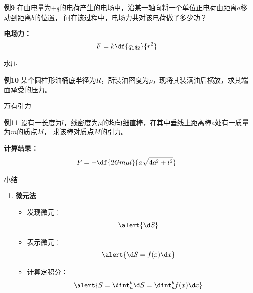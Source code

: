\begin{frame}
	\linespread{1.5}
	\begin{exampleblock}{{\bf 例9}\hfill}
		在由电量为$+q$的电荷产生的电场中，沿某一轴向将一个单位正电荷由距离$a$移动到距离$b$的位置，
		问在该过程中，电场力共对该电荷做了多少功？
	\end{exampleblock}
	\bigskip
	{\bf 电场力：}
	$$F=k\df{q_1q_2}{r^2}$$
\end{frame}

\begin{frame}{水压}
	\linespread{1.5}
	\begin{exampleblock}{{\bf 例10}\hfill}
		某个圆柱形油桶底半径为$R$，所装油密度为$\rho$，现将其装满油后横放，求其端面承受的压力。
	\end{exampleblock}
\end{frame}

\begin{frame}{万有引力}
	\linespread{1.2}
	\begin{exampleblock}{{\bf 例11}\hfill}
		设有一长度为$l$，线密度为$\mu$的均匀细直棒，在其中垂线上距离棒$a$处有一质量为$m$的质点$M$，
		求该棒对质点$M$的引力。
	\end{exampleblock}
	{\bf 计算结果：}
	$$F=-\df{2Gm\mu l}{a\sqrt{4a^2+l^2}}$$
\end{frame}

\begin{frame}[<+->]{小结}
	\linespread{1.2}
	\begin{enumerate}
	  \item {\bf 微元法}
	  \begin{itemize}
	    \item 发现微元：$$\alert{\d S}$$
	    \item 表示微元：$$\alert{\d S=f(x)\d x}$$
	    \item 计算定积分：$$\alert{S=\dint_a^b\d S=\dint_a^bf(x)\d x}$$
	  \end{itemize}
	\end{enumerate}
\end{frame}


